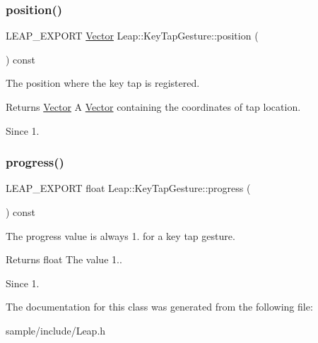 \subsubsection{\texorpdfstring{position()}{position()}}
{\footnotesize\ttfamily L\+E\+A\+P\+\_\+\+E\+X\+P\+O\+RT \hyperlink{struct_leap_1_1_vector}{Vector} Leap\+::\+Key\+Tap\+Gesture\+::position (\begin{DoxyParamCaption}{ }\end{DoxyParamCaption}) const}

The position where the key tap is registered.


\begin{DoxyCodeInclude}
\end{DoxyCodeInclude}


\begin{DoxyReturn}{Returns}
\hyperlink{struct_leap_1_1_vector}{Vector} A \hyperlink{struct_leap_1_1_vector}{Vector} containing the coordinates of tap location. 
\end{DoxyReturn}
\begin{DoxySince}{Since}
1. 
\end{DoxySince}
\mbox{\label{class_leap_1_1_key_tap_gesture_a3df8d13a9b67a25886f41b8a674d30de}} 
\subsubsection{\texorpdfstring{progress()}{progress()}}
{\footnotesize\ttfamily L\+E\+A\+P\+\_\+\+E\+X\+P\+O\+RT float Leap\+::\+Key\+Tap\+Gesture\+::progress (\begin{DoxyParamCaption}{ }\end{DoxyParamCaption}) const}

The progress value is always 1. for a key tap gesture.

\begin{DoxyReturn}{Returns}
float The value 1.. 
\end{DoxyReturn}
\begin{DoxySince}{Since}
1. 
\end{DoxySince}


The documentation for this class was generated from the following file\+:\begin{DoxyCompactItemize}
\item 
sample/include/Leap.\+h\end{DoxyCompactItemize}
